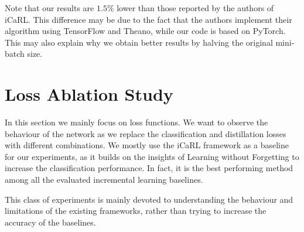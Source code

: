 \documentclass[10pt,twocolumn,letterpaper]{article}
\begin{document}
Note that our results are $1.5\%$ lower than those reported by the authors of iCaRL. This difference may be due to the fact that the authors implement their algorithm using TensorFlow and Theano, while our code is based on PyTorch. This may also explain why we obtain better results by halving the original mini-batch size.

\section{Loss Ablation Study}
\label{section:loss}

In this section we mainly focus on loss functions. We want to observe the behaviour of the network as we replace the classification and distillation losses with different combinations. We mostly use the iCaRL framework as a baseline for our experiments, as it builds on the insights of Learning without Forgetting to increase the classification performance. In fact, it is the best performing method among all the evaluated incremental learning baselines.

This class of experiments is mainly devoted to understanding the behaviour and limitations of the existing frameworks, rather than trying to increase the accuracy of the baselines.
\end{document}
